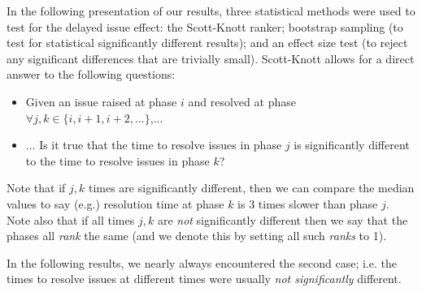\documentclass[smallcondensed]{svjour3}
\newcommand{\bi}{\begin{itemize}}%
\newcommand{\ei}{\end{itemize}}
\begin{document}
    In the following presentation of our results, three statistical methods were used to test for the delayed
    issue effect: the Scott-Knott ranker;   bootstrap sampling (to test for statistical significantly
    different results); and an effect size test (to reject any significant differences that are trivially small).
    Scott-Knott allows for a direct answer to the following questions:
    \bi
    \item
    Given an issue
    raised at phase $i$ and resolved at phase $\forall j,k \in \{i,i+1,i+2,...\}$,...
    \item 
    ... Is it
    true that  the time to resolve issues in phase $j$ is significantly different 
    to the time to resolve issues in phase $k$? 
    \ei
    Note that if $j,k$ times are significantly different, then we can compare
    the median values to say (e.g.) resolution time at phase $k$ is 3 times slower than phase $j$.
    Note also that if all times $j,k$ are {\em not} significantly different
    then we say that the phases all {\em rank} the same (and we denote this by setting
    all such {\em ranks} to 1).
    
    In the following results, we nearly always encountered the second case;
    i.e.   the times to resolve issues at different times were usually {\em not significantly}
    different.
    
\end{document}
